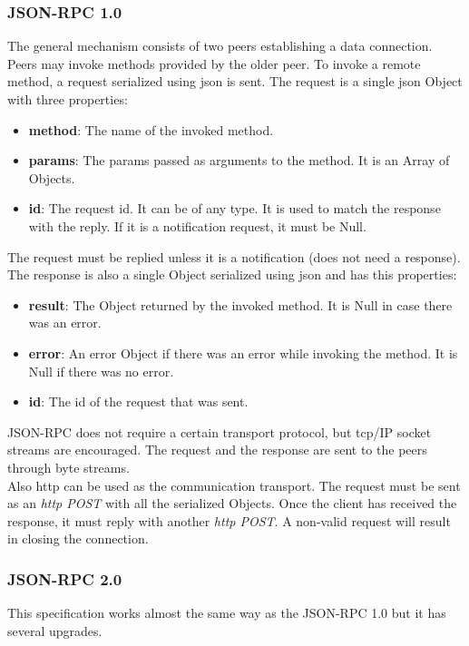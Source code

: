 \subsubsection{JSON-RPC 1.0}
The general mechanism consists of two peers establishing a data connection\cite{json-rpc-1}. Peers may invoke methods provided by the older peer. To invoke a remote method, a request serialized using \acrshort{json} is sent. The request is a single \acrshort{json} Object with three properties:
\begin{itemize}
    \item \textbf{method}: The name of the invoked method.
    \item \textbf{params}: The params passed as arguments to the method. It is an Array of Objects.
    \item \textbf{id}: The request id. It can be of any type. It is used to match the response with the reply. If it is a notification request, it must be Null.
\end{itemize}
The request must be replied unless it is a notification (does not need a response). The response is also a single Object serialized using \acrshort{json} and has this properties:
\begin{itemize}
    \item \textbf{result}: The Object returned by the invoked method. It is Null in case there was an error.
    \item \textbf{error}: An error Object if there was an error while invoking the method. It is Null if there was no error.
    \item \textbf{id}: The id of the request that was sent.
\end{itemize}
JSON-RPC does not require a certain transport protocol, but \acrshort{tcp}/IP socket streams are encouraged. The request and the response are sent to the peers through byte streams.\\

Also \acrshort{http} can be used as the communication transport. The request must be sent as an \textit{\acrshort{http} POST} with all the serialized Objects. Once the client has received the response, it must reply with another \textit{\acrshort{http} POST}. A non-valid request will result in closing the connection.
\subsubsection{JSON-RPC 2.0}
This specification\cite{json-rpc-2} works almost the same way as the JSON-RPC 1.0 but it has several upgrades.\\

